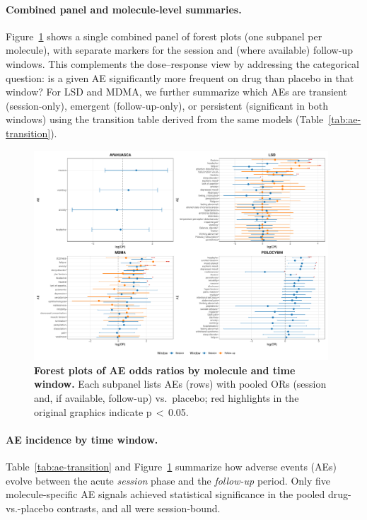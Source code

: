 \paragraph{Combined panel and molecule-level summaries.}
Figure~\ref{fig:forest-combined} shows a single combined panel of forest plots (one subpanel per molecule), with separate markers for the session and (where available) follow-up windows. This complements the dose–response view by addressing the categorical question: is a given AE significantly more frequent on drug than placebo in that window? For LSD and MDMA, we further summarize which AEs are transient (session-only), emergent (follow-up-only), or persistent (significant in both windows) using the transition table derived from the same models (Table~\ref{tab:ae-transition}).

\begin{figure}[htb]
  \centering
  \includegraphics[width=0.98\textwidth]{figures/forest_combined_all_molecules.pdf}
  \caption{\textbf{Forest plots of AE odds ratios by molecule and time window.}
  Each subpanel lists AEs (rows) with pooled ORs (session and, if available, follow-up) vs.\ placebo; red highlights in the original graphics indicate p\,$<\,$0.05.}
  \label{fig:forest-combined}
\end{figure}




\paragraph{AE incidence by time window.}
Table~\ref{tab:ae-transition} and Figure~\ref{fig:forest-combined} summarize how adverse events (AEs) evolve between the acute \textit{session} phase and the \textit{follow-up} period.
Only five molecule-specific AE signals achieved statistical significance in the pooled drug-vs.-placebo contrasts, and all were session-bound.


